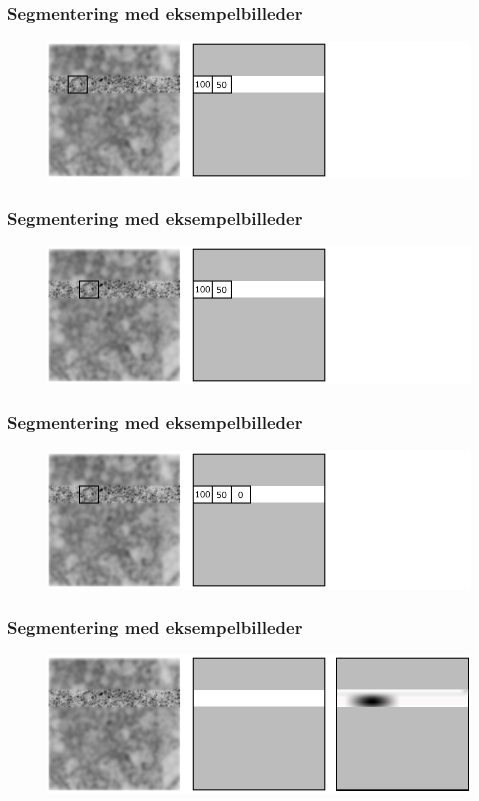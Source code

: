 \documentclass[12pt,t]{beamer}
\begin{document}
\begin{frame}
\frametitle{Segmentering med eksempelbilleder}
\begin{figure}[H]
\includegraphics[scale=0.35]{img/afstand/12.png}
\end{figure}
\end{frame}

\begin{frame}
\frametitle{Segmentering med eksempelbilleder}
\begin{figure}[H]
\includegraphics[scale=0.35]{img/afstand/13.png}
\end{figure}
\end{frame}

\begin{frame}
\frametitle{Segmentering med eksempelbilleder}
\begin{figure}[H]
\includegraphics[scale=0.35]{img/afstand/14.png}
\end{figure}
\end{frame}


\begin{frame}
\frametitle{Segmentering med eksempelbilleder}
\begin{figure}[H]
\includegraphics[scale=0.35]{img/afstand/15.png}
\end{figure}
\end{frame}
\end{document}
